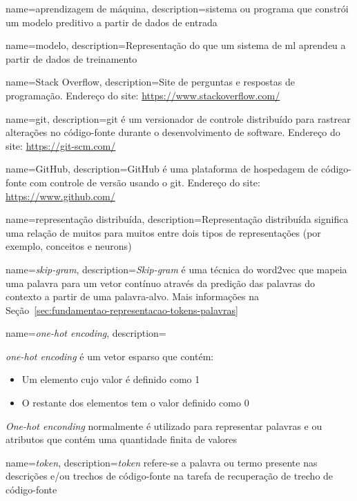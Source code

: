 {
    name=aprendizagem de máquina,
    description={sistema ou programa que constrói um modelo preditivo a partir de dados de entrada \citep{glossary-ml}}
}

{
    name=modelo,
    description={Representação do que um sistema de \gls{ml} aprendeu a partir de dados de treinamento \citep{glossary-ml}}
}

{
    name=Stack Overflow,
    description={Site de perguntas e respostas de programação. Endereço do site: \url{https://www.stackoverflow.com/}}
}

{
    name=git,
    description={git é um versionador de controle distribuído para rastrear alterações no código-fonte durante o desenvolvimento de software. Endereço do site: \url{https://git-scm.com/} \citep{wikipedia-git-2019}}
}

{
    name=GitHub,
    description={GitHub é uma plataforma de hospedagem de código-fonte com controle de versão usando o \gls{git}. Endereço do site: \url{https://www.github.com/}}
}

{
    name=representação distribuída,
    description={Representação distribuída significa uma relação de muitos para muitos entre dois tipos de representações (por exemplo, conceitos e \gls{neuron}s) \citep{Hinton-distributed-representatons:1986}
    }
}

{
    name=\textit{skip-gram},
    description={\textit{Skip-gram} é uma técnica do \gls{word2vec} que mapeia uma palavra para um vetor contínuo através da predição das palavras do contexto a partir de uma palavra-alvo. Mais informações na Seção~\ref{sec:fundamentao-representacao-tokens-palavras}
    }
}

{
    name=\textit{one-hot encoding},
    description={\textit{one-hot encoding} é um vetor esparso que contém:
    \begin{itemize}
        \item Um elemento cujo valor é definido como 1
        \item O restante dos elementos tem o valor definido como 0
    \end{itemize}
    \textit{One-hot enconding} normalmente é utilizado para representar palavras e ou atributos que contém uma quantidade finita de valores \citep{glossary-ml}
    }
}

{
    name=\textit{token},
    description={\textit{token} refere-se a palavra ou termo presente nas descrições e/ou trechos de código-fonte na tarefa de recuperação de trecho de código-fonte
    }
}

